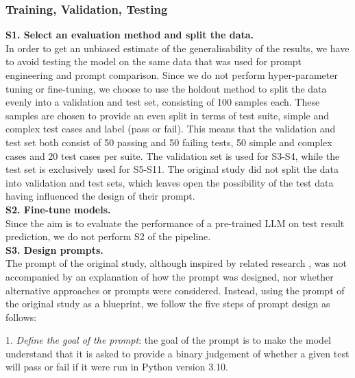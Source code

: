 \documentclass[a4paper]{article}
\begin{document}
\subsubsection{Training, Validation, Testing}
\textbf{S1. Select an evaluation method and split the data.}\\
In order to get an unbiased estimate of the generalisability of the results, we have to avoid testing the model on the same data that was used for prompt engineering and prompt comparison. Since we do not perform hyper-parameter tuning or fine-tuning, we choose to use the holdout method to split the data evenly into a validation and test set, consisting of 100 samples each. These samples are chosen to provide an even split in terms of test suite, simple and complex test cases and label (pass or fail). This means that the validation and test set both consist of 50 passing and 50 failing tests, 50 simple and complex cases and 20 test cases per suite. The validation set is used for S3-S4, while the test set is exclusively used for S5-S11. The original study did not split the data into validation and test sets, which leaves open the possibility of the test data having influenced the design of their prompt.\\

\textbf{S2. Fine-tune models.}\\
Since the aim is to evaluate the performance of a pre-trained LLM on test result prediction, we do not perform S2 of the pipeline.\\

\textbf{S3. Design prompts.}\\
The prompt of the original study, although inspired by related research \cite{tufano2023predictingcodecoverageexecution}, was not accompanied by an explanation of how the prompt was designed, nor whether alternative approaches or prompts were considered. Instead, using the prompt of the original study as a blueprint, we follow the five steps of prompt design as follows:

1. \textit{Define the goal of the prompt}: the goal of the prompt is to make the model understand that it is asked to provide a binary judgement of whether a given test will pass or fail if it were run in Python version 3.10. 
\end{document}
